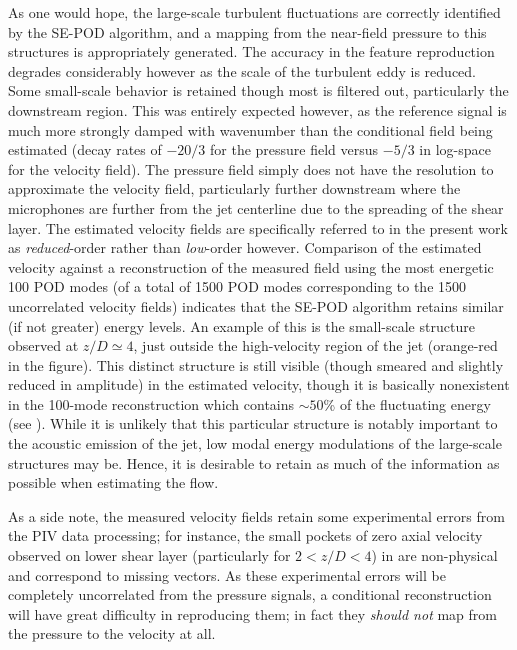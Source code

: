 As one would hope, the large-scale turbulent fluctuations are correctly identified by the SE-POD algorithm, and a mapping from the near-field pressure to this structures is appropriately generated.
The accuracy in the feature reproduction degrades considerably however as the scale of the turbulent eddy is reduced.
Some small-scale behavior is retained though most is filtered out, particularly the downstream region.
This was entirely expected however, as the reference signal is much more strongly damped with wavenumber than the conditional field being estimated (decay rates of $-20/3$ for the pressure field versus $-5/3$ in log-space for the velocity field).
The pressure field simply does not have the resolution to approximate the velocity field, particularly further downstream where the microphones are further from the jet centerline due to the spreading of the shear layer.
The estimated velocity fields are specifically referred to in the present work as \textit{reduced}-order rather than \textit{low}-order however.
Comparison of the estimated velocity against a reconstruction of the measured field using the most energetic 100 POD modes (of a total of 1500 POD modes corresponding to the 1500 uncorrelated velocity fields) indicates that the SE-POD algorithm retains similar (if not greater) energy levels.
An example of this is the small-scale structure observed at $z/D \simeq 4$, just outside the high-velocity region of the jet (orange-red in the figure).
This distinct structure is still visible (though smeared and slightly reduced in amplitude) in the estimated velocity, though it is basically nonexistent in the 100-mode reconstruction which contains $\sim 50$\% of the fluctuating energy (see ).
While it is unlikely that this particular structure is notably important to the acoustic emission of the jet, low modal energy modulations of the large-scale structures may be.
Hence, it is desirable to retain as much of the information as possible when estimating the flow.

As a side note, the measured velocity fields retain some experimental errors from the PIV data processing; for instance, the small pockets of zero axial velocity observed on lower shear layer (particularly for $2 < z/D < 4$) in  are non-physical and correspond to missing vectors. 
As these experimental errors will be completely uncorrelated from the pressure signals, a conditional reconstruction will have great difficulty in reproducing them; in fact they \textit{should not} map from the pressure to the velocity at all.

